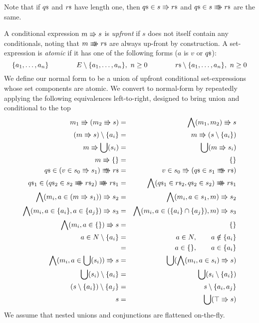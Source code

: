 Note that if ${q}{\scriptstyle\$}$ and ${r}{\scriptstyle\$}$ have length one, then ${q}{\scriptstyle\$} \in s \Rrightarrow {r}{\scriptstyle\$}$ and ${q}{\scriptstyle\$} \in s \Rrightarrow\mkern-14mu\Rrightarrow {r}{\scriptstyle\$}$
are the same.

\newpage
A conditional expression $m \Rrightarrow s$ is \emph{upfront}
if $s$ does not itself contain any conditionals,
noting that $m \Rrightarrow\mkern-14mu\Rrightarrow {r}{\scriptstyle\$}$ are always up-front by construction.
A set-expression is \emph{atomic} if it has one of the
following forms ($a$ is $v$ or ${q}{\scriptstyle\$}$):
$$
  \{ a_1, \ldots, a_n\}
  \qquad\qquad
  E \setminus \{ a_1 , \ldots, a_n \}, ~  n \geq 0
  \qquad\qquad {r}{\scriptstyle\$}\setminus \{ a_1 , \ldots, a_n \}, ~  n \geq 0
$$
We define our normal form to be a union of upfront conditional set-expressions
whose set components are atomic.
We convert to normal-form by repeatedly applying the following equivalences
left-to-right,
designed to bring union and conditional to the top
\begin{eqnarray*}
   m_1 \sthen (m_2 \sthen s) &=& \bigwedge(m_1,m_2) \sthen s
\\ (m \sthen s) \setminus \setof{a_i} &=& m \sthen (s \setminus \setof{a_i})
\\ m \sthen \bigcup( s_i ) &=& \bigcup( m \sthen s_i )
\\ m \sthen \setof{} &=& \setof{}
\\ \lst q \in (v \in s_0 \sthen s_1) \ssthen \lst r
   &=&
   v \in s_0 \sthen ( \lst q \in s_1 \ssthen \lst r)
\\ \lst q_1 \in (\lst q_2 \in s_2 \ssthen \lst r_2) \ssthen \lst r_1
   &=&
   \bigwedge(\lst q_1 \in \lst r_2,\lst q_2 \in s_2) \ssthen \lst r_1
\\ \bigwedge( m_i, a \in (m \sthen s_1) )\sthen s_2
   &=& \bigwedge( m_i, a \in s_1, m ) \sthen s_2
\\ \bigwedge( m_i, a \in \setof{a_i}, a \in \setof{a_j} )\sthen s_3
   &=& \bigwedge( m_i, a \in (\setof{a_i}\cap\setof{a_j}), m ) \sthen s_3
\\ \bigwedge( m_i, a \in \setof{} ) \sthen s &=& \setof{}
\\ a \in N \setminus \setof{a_i}
   &=& a \in N, \qquad a \notin \setof{a_i}
\\ &=& a \in \setof {}, \qquad a \in \setof{a_i}
\\ \bigwedge( m_i, a \in \bigcup( s_i ) )\sthen s
   &=& \bigcup( \bigwedge( m_i, a \in s_i ) \sthen s)
\\ \bigcup( s_i ) \setminus \setof{ a_i }
   &=&
   \bigcup( s_i \setminus \setof{ a_i} )
\\ (s \setminus \setof{ a_i} ) \setminus \setof{ a_j }
   &=&
   s \setminus \setof{ a_i, a_j }
\\ s &=& \bigcup( \top \sthen s )
\end{eqnarray*}
We assume that nested unions and conjunctions are flattened on-the-fly.

